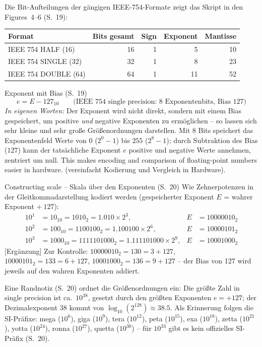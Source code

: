 Die Bit-Aufteilungen der gängigen IEEE-754-Formate zeigt das Skript in den Figures~4--6 (S.~19):
\begin{center}
\begin{tabular}{lrrrr}
\toprule
Format & Bits gesamt & Sign & Exponent & Mantisse \\
\midrule
IEEE 754 HALF (16)   & 16 & 1 & 5  & 10 \\
IEEE 754 SINGLE (32) & 32 & 1 & 8  & 23 \\
IEEE 754 DOUBLE (64) & 64 & 1 & 11 & 52 \\
\bottomrule
\end{tabular}
\end{center}

\begin{satzbox}{Exponent mit Bias (S.~19)}
\[
e = E - 127_{10} \qquad \text{(IEEE 754 single precision: 8 Exponentenbits, Bias 127)}
\]
\emph{In eigenen Worten:} Der Exponent wird nicht direkt, sondern mit einem Bias gespeichert, um positive \emph{und} negative Exponenten zu ermöglichen -- so lassen sich sehr kleine und sehr große Größenordnungen darstellen. Mit 8 Bits speichert das Exponentenfeld Werte von $0$ ($2^0 - 1$) bis $255$ ($2^8 - 1$); durch Subtraktion des Bias ($127$) kann der tatsächliche Exponent $e$ positive und negative Werte annehmen, zentriert um null. \glqq This makes encoding and comparison of floating-point numbers easier in hardware.\grqq{} (vereinfacht Kodierung und Vergleich in Hardware).
\end{satzbox}

\begin{bspbox}{Constructing scale -- Skala über den Exponenten (S.~20)}
Wie Zehnerpotenzen in der Gleitkommadarstellung kodiert werden (gespeicherter Exponent $E$ = wahrer Exponent $+\ 127$):
\begin{align*}
10^1 &= 10_{10} = 1010_2 = 1.010 \times 2^3, & E &= 10000010_2 \\
10^2 &= 100_{10} = 1100100_2 = 1.100100 \times 2^6, & E &= 10000101_2 \\
10^3 &= 1000_{10} = 1111101000_2 = 1.111101000 \times 2^9, & E &= 10001000_2
\end{align*}
[Ergänzung] Zur Kontrolle: $10000010_2 = 130 = 3 + 127$, $10000101_2 = 133 = 6 + 127$, $10001000_2 = 136 = 9 + 127$ -- der Bias von 127 wird jeweils auf den wahren Exponenten addiert.
\end{bspbox}

Eine Randnotiz (S.~20) ordnet die Größenordnungen ein: Die größte Zahl in single precision ist ca.\ $10^{38}$, gesetzt durch den größten Exponenten $e = +127$; der Dezimalexponent 38 kommt von $\log_{10}(2^{128}) \approx 38.5$. Als Erinnerung folgen die SI-Präfixe: mega ($10^6$), giga ($10^9$), tera ($10^{12}$), peta ($10^{15}$), exa ($10^{18}$), zetta ($10^{21}$), yotta ($10^{24}$), ronna ($10^{27}$), quetta ($10^{30}$) -- für $10^{33}$ gibt es kein offizielles SI-Präfix (S.~20).

